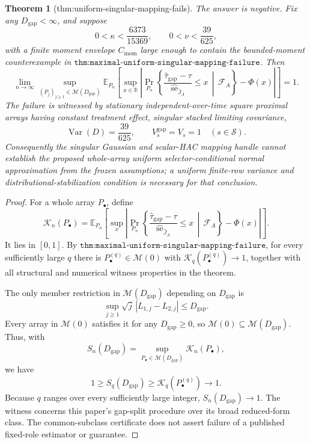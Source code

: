 \documentclass{article}
\newtheorem{theorem}{Theorem}
\begin{document}
\begin{theorem}[thm:uniform-singular-mapping-fails]\label{thm:uniform-singular-mapping-fails}
The answer is negative.  Fix any \(D_{\mathrm{gap}}<\infty\), and suppose
\[
 0<\kappa<\frac{6373}{15369},
 \qquad
 0<\nu<\frac{39}{625},
\]
with a finite moment envelope \(C_{\mathrm{mom}}\) large enough to contain the bounded-moment counterexample in \(\texttt{thm:maximal-uniform-singular-mapping-failure}\).  Then
\[
 \lim_{n\to\infty}
 \sup_{(P_j)_{j\geq1}\in\mathcal M(D_{\mathrm{gap}})}
 \mathbb E_{P_n}\!\left[
  \sup_{x\in\mathbb R}
  \left|
   \Pr_{P_n}\!\left\{
    \frac{\widehat\tau_{\mathrm{gap}}-\tau}
         {\widehat{\operatorname{se}}_{\widehat J_A}}
    \leq x\,\middle|\,\mathcal F_A
   \right\}-\Phi(x)
  \right|
 \right]
 =1.
\]
The failure is witnessed by stationary independent-over-time square proximal arrays having constant treatment effect, singular stacked limiting covariance,
\[
 \operatorname{Var}(D)=\frac{39}{625},
 \qquad
 V_s^{\mathrm{gap}}=V_s=1
 \quad(s\in\mathcal S).
\]
Consequently the singular Gaussian and scalar-HAC mapping handle cannot establish the proposed whole-array uniform selector-conditional normal approximation from the frozen assumptions; a uniform finite-row variance and distributional-stabilization condition is necessary for that conclusion.
\end{theorem}
\begin{proof}
For a whole array \(P_\bullet\), define
\[
 \mathcal K_n(P_\bullet)=
 \mathbb E_{P_n}\left[
  \sup_x\left|
   \Pr_{P_n}\left\{
    \frac{\widehat\tau_{\mathrm{gap}}-\tau}
         {\widehat{\operatorname{se}}_{\widehat J_A}}
    \leq x\,\middle|\,\mathcal F_A
   \right\}-\Phi(x)
  \right|
 \right].
\]
It lies in \([0,1]\).  By \(\texttt{thm:maximal-uniform-singular-mapping-failure}\), for every sufficiently large \(q\) there is \(P_\bullet^{(q)}\in\mathcal M(0)\) with \(\mathcal K_q(P_\bullet^{(q)})\to1\), together with all structural and numerical witness properties in the theorem.

The only member restriction in \(\mathcal M(D_{\mathrm{gap}})\) depending on \(D_{\mathrm{gap}}\) is
\[
 \sup_{j\geq1}\sqrt j\,|L_{1,j}-L_{2,j}|\leq D_{\mathrm{gap}}.
\]
Every array in \(\mathcal M(0)\) satisfies it for any \(D_{\mathrm{gap}}\geq0\), so \(\mathcal M(0)\subseteq\mathcal M(D_{\mathrm{gap}})\).  Thus, with
\[
 S_n(D_{\mathrm{gap}})=\sup_{P_\bullet\in\mathcal M(D_{\mathrm{gap}})}\mathcal K_n(P_\bullet),
\]
we have
\[
 1\geq S_q(D_{\mathrm{gap}})\geq\mathcal K_q(P_\bullet^{(q)})\to1.
\]
Because \(q\) ranges over every sufficiently large integer, \(S_n(D_{\mathrm{gap}})\to1\).  The witness concerns this paper's gap-split procedure over its broad reduced-form class.  The common-subclass certificate does not assert failure of a published fixed-role estimator or guarantee.
\end{proof}
\end{document}
